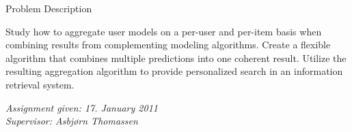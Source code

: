 \null\vspace{15em}
{
  \centering
  \normalfont
  \huge
  Problem Description\\
}
\vspace{2em}

\noindent
Study how to aggregate user models on a per-user and per-item
basis when combining results from complementing modeling algorithms.
Create a flexible algorithm that combines multiple predictions
into one coherent result.
Utilize the resulting aggregation algorithm
to provide personalized search in an information retrieval system.

\vspace{1em}
\begin{flushleft}
  \color{red}
  \itshape
  \hspace{2.5em}Assignment given: 17. January 2011\\
  \hspace{2.5em}Supervisor: Asbjørn Thomassen\\
\end{flushleft}

\cleardoublepage
